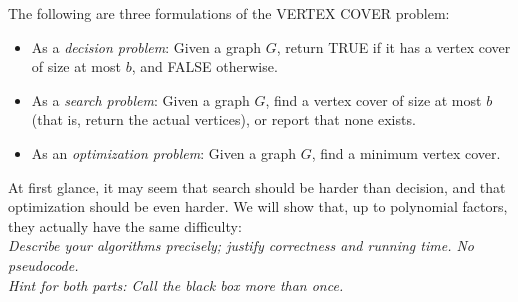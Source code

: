 \documentclass{article}\usepackage[utf8]{inputenc}\usepackage[margin=0.4cm,top=0.4cm,bottom=0.4cm]{geometry}\usepackage[usenames,dvipsnames,svgnames,table]{xcolor}
\begin{document}
\noindent The following are three formulations of the \textsc{VERTEX COVER} problem:
\begin{itemize}
\item As a \textit{decision problem}: Given a graph $G$, return TRUE if it has a vertex cover of size at most $b$, and FALSE otherwise.
\item As a \textit{search problem}: Given a graph $G$, find a vertex cover of size at most $b$ (that is, return the actual vertices), or report that none exists.
\item As an \textit{optimization problem}: Given a graph $G$, find a minimum  vertex cover.
\end{itemize}
\vspace{4pt}
\noindent At first glance, it may seem that search should be harder than decision, and that optimization should be even harder. We will show that, up to polynomial factors, they actually have the same difficulty:\\
\noindent \textit{Describe your algorithms precisely; justify correctness and running time. No pseudocode.}\\
\noindent \textit{Hint for both parts: Call the black box more than once.}
\end{document}
